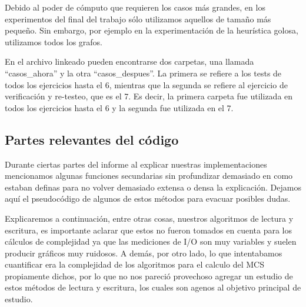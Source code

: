 Debido al poder de cómputo que requieren los casos más grandes, en los experimentos del final del trabajo sólo utilizamos aquellos de tamaño más pequeño. Sin embargo, por ejemplo en la experimentación de la heurística golosa,  utilizamos todos los grafos.

En el archivo linkeado pueden encontrarse dos carpetas, una llamada ``casos\_ahora'' y la otra ``casos\_despues''. La primera se refiere a los tests de todos los ejercicios hasta el 6, mientras que la segunda se refiere al ejercicio de verificación y re-testeo, que es el 7. Es decir, la primera carpeta fue utilizada en todos los ejercicios hasta el 6 y la segunda fue utilizada en el 7.

\newpage
\subsection{Partes relevantes del código}
\lstset{language=C++, breaklines=true, basicstyle=\footnotesize}
\lstset{numbers=left, numberstyle=\tiny, stepnumber=1, numbersep=5pt, tabsize=2}

Durante ciertas partes del informe al explicar nuestras implementaciones mencionamos algunas funciones secundarias sin profundizar demasiado en como estaban definas para no volver demasiado extensa o densa la explicación. Dejamos aquí el pseudocódigo de algunos de estos métodos para evacuar posibles dudas.

Explicaremos a continuación, entre otras cosas, nuestros algoritmos de lectura y escritura, es importante aclarar que estos no fueron tomados en cuenta para los cálculos de complejidad ya que las mediciones de I/O son muy variables y suelen producir gráficos muy ruidosos. A demás, por otro lado, lo que intentabamos cuantificar era la complejidad de los algoritmos para el calculo del MCS propiamente dichos, por lo que no nos pareció provechoso agregar un estudio de estos métodos de lectura y escritura, los cuales son agenos al objetivo principal de estudio.

